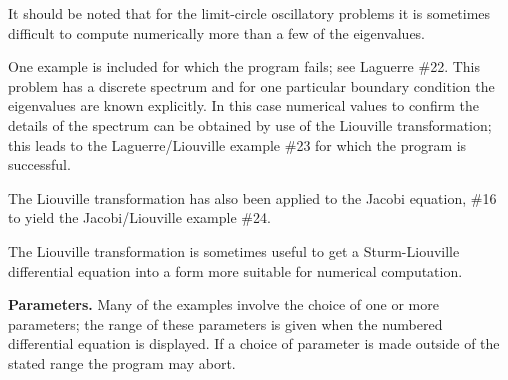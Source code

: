 It should be noted that for the limit-circle oscillatory problems it is
sometimes difficult to compute numerically more than a few of the
eigenvalues.  

One example is included for which the program fails; see Laguerre
\#22.  This problem has a discrete spectrum and for one particular
boundary condition the eigenvalues are known explicitly.  In this case
numerical values to confirm the details of the spectrum can be obtained
by use of the Liouville transformation; this leads to
the Laguerre/Liouville
example \#23 for which the program is successful.

The Liouville transformation has also been applied to the Jacobi
equation, \#16 to yield the Jacobi/Liouville example \#24.

The Liouville transformation is sometimes useful to get a
Sturm-Liouville differential equation into a form more suitable for numerical
computation.

{\bf Parameters.}  Many of the examples involve the choice of one or more
parameters; the range of these parameters is given when the numbered
differential equation is displayed.  If a choice of parameter is made
outside of the stated range the program may abort.

